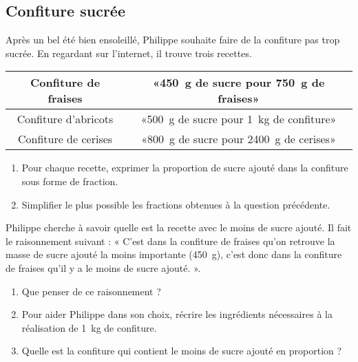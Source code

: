 
\subsection*{Confiture sucrée}

Après un bel été bien ensoleillé, Philippe souhaite faire de la confiture pas trop sucrée. En regardant sur l'internet, il trouve trois recettes.

\begin{center}
    \begin{tabular}[]{|c|c|}
        \hline
        Confiture de fraises&«\SI{450}{\gram} de sucre pour \SI{750}{\gram} de fraises» \\
        \hline
        Confiture d'abricots& «\SI{500}{\gram} de sucre pour \SI{1}{\kilo\gram} de confiture» \\
        \hline
        Confiture de cerises&  «\SI{800}{\gram} de sucre pour \SI{2400}{\gram} de cerises» \\ 
        \hline
    \end{tabular}
\end{center}

\begin{enumerate}
    \item
Pour chaque recette, exprimer la proportion de sucre ajouté dans la confiture sous forme de fraction.
\item
    Simplifier le plus possible les fractions obtenues à la question précédente.
\end{enumerate}

Philippe cherche à savoir quelle est la recette avec le moins de sucre ajouté. Il fait le raisonnement suivant : « C'est dans la confiture de fraises qu'on retrouve la masse de sucre ajouté la moins importante (\SI{450}{\gram}), c'est donc dans la confiture de fraises qu'il y a le moins de sucre ajouté. ». 

\begin{enumerate}
    \item
Que penser de ce raisonnement ?
\item
Pour aider Philippe dans son choix, récrire les ingrédients nécessaires à la réalisation de \SI{1}{\kilo\gram} de confiture.
\item
Quelle est la confiture qui contient le moins de sucre ajouté en proportion ?
\end{enumerate}
